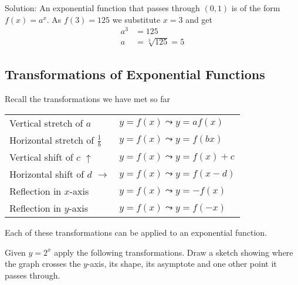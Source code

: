 Solution: An
exponential function that passes through $\left (0 ,1\right )$ is of the form $f (x) =a^{x}$. As $f (3) =125$ we substitute $x =3$ and get
\begin{align*}a^{3} &  = 125 \\
a &  = \sqrt[{3}]{125} =5\end{align*}

\subsection{Transformations of Exponential Functions}
Recall the transformations we have met so far 


\begin{tabular}[c]{ll}Vertical stretch of $a$  & $y =f (x) \leadsto y =a f (x)$  \\
Horizontal stretch of $\frac{1}{b}$  & $y =f (x) \leadsto y =f (b x)$  \\
Vertical shift of $c$ $\uparrow $  & $y =f (x) \leadsto y =f (x) +c$  \\
Horizontal shift of $d$ $ \longrightarrow $  & $y =f (x) \leadsto y =f (x -d)$  \\
Reflection in $x$-axis  & $y =f (x) \leadsto y = -f (x)$  \\
Reflection in $y$-axis  & $y =f (x) \leadsto y =f ( -x)$
\end{tabular}

Each of these transformations can be applied to an exponential
function. 

Given $y =2^{x}$ apply the following transformations. Draw a sketch showing where the graph crosses the
$y$-axis, its shape, its asymptote and one other point it passes through. 



